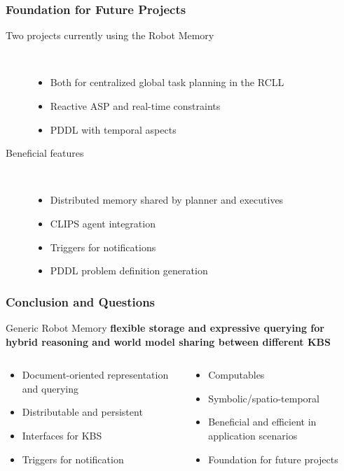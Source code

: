 \begin{frame}
  \frametitle{Foundation for Future Projects}
  \begin{description}
  \item[Two projects currently using the Robot Memory]\hfill\\
    \begin{itemize}
    \item Both for centralized global task planning in the RCLL
    \item Reactive ASP and real-time constraints
    \item PDDL with temporal aspects
    \end{itemize}
    \pause
  \item[Beneficial features] \hfill \\
    \begin{itemize}
    \item Distributed memory shared by planner and executives
    \item CLIPS agent integration
    \item Triggers for notifications
    \item PDDL problem definition generation
    \end{itemize}
  \end{description}
\end{frame}

\begin{frame}
  \frametitle{Conclusion and Questions}
  \begin{block}{Generic Robot Memory } \centering\bfseries
    flexible storage and expressive querying for hybrid reasoning and world model sharing between different KBS
  \end{block}
  \bigskip
  \pause
  \begin{columns}
    \begin{column}{0.5\textwidth}
      \begin{itemize}
      \item Document-oriented representation and querying
      \item Distributable and persistent
      \item Interfaces for KBS
      \item Triggers for notification
      \end{itemize}
    \end{column}
    \begin{column}{0.5\textwidth}
      \begin{itemize}
      \item Computables
      \item Symbolic/spatio-temporal
      \item Beneficial and efficient in application scenarios
      \item Foundation for future projects
      \end{itemize}
    \end{column}
  \end{columns}
\end{frame}




